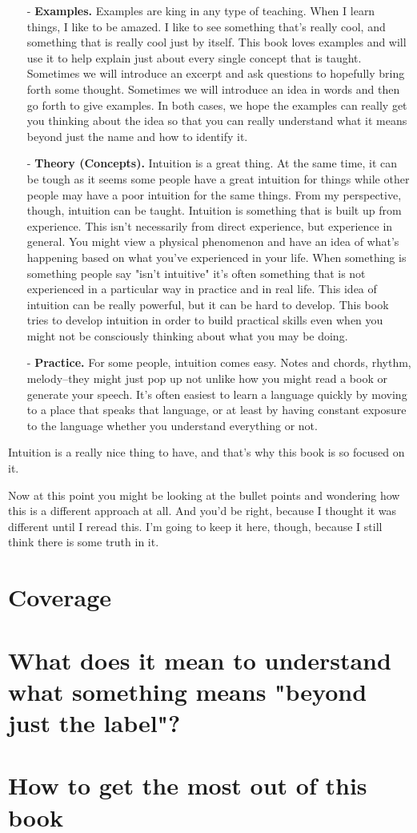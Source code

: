 \documentclass[../OpenAppliedMusicTheory.tex]{subfiles}
\begin{document}
    \begin{itemize}
        \item[-] \textbf{Examples.} Examples are king in any type of teaching. When I learn things, I like to be amazed. I like to see something that's really cool, and something that is really cool just by itself. This book loves examples and will use it to help explain just about every single concept that is taught. Sometimes we will introduce an excerpt and ask questions to hopefully bring forth some thought. Sometimes we will introduce an idea in words and then go forth to give examples. In both cases, we hope the examples can really get you thinking about the idea so that you can really understand what it means beyond just the name and how to identify it.
        \item[-] \textbf{Theory (Concepts).} Intuition is a great thing. At the same time, it can be tough as it seems some people have a great intuition for things while other people may have a poor intuition for the same things. From my perspective, though, intuition can be taught. Intuition is something that is built up from experience. This isn't necessarily from direct experience, but experience in general. You might view a physical phenomenon and have an idea of what's happening based on what you've experienced in your life. When something is something people say "isn't intuitive" it's often something that is not experienced in a particular way in practice and in real life. This idea of intuition can be really powerful, but it can be hard to develop. This book tries to develop intuition in order to build practical skills even when you might not be consciously thinking about what you may be doing.
        \item[-] \textbf{Practice.} For some people, intuition comes easy. Notes and chords, rhythm, melody--they might just pop up not unlike how you might read a book or generate your speech. It's often easiest to learn a language quickly by moving to a place that speaks that language, or at least by having constant exposure to the language whether you understand everything or not.
    \end{itemize}

    Intuition is a really nice thing to have, and that's why this book is so focused on it.

    Now at this point you might be looking at the bullet points and wondering how this is a different approach at all. And you'd be right, because I thought it was different until I reread this. I'm going to keep it here, though, because I still think there is some truth in it. %

    \section*{Coverage}

    \section*{What does it mean to understand what something means "beyond just the label"?}

    \section*{How to get the most out of this book}
\end{document}
